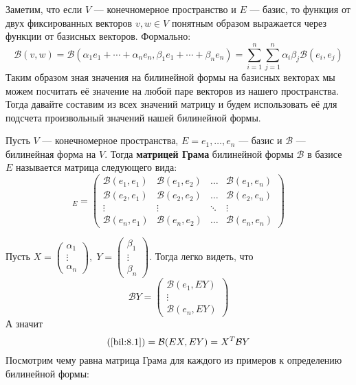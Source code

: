 \documentclass[../main.tex]{subfiles}
\begin{document}
Заметим, что если $V$ --- конечномерное пространство и $E$ --- базис, то функция от двух фиксированных векторов $v, w \in V$ понятным образом выражается через функции от базисных векторов. Формально:
\begin{equation}
\label{bil:8.1}
\tag{*}
  \mathcal{B}(v, w) =
  \mathcal{B}(\alpha_1 e_1 + \dotsb + \alpha_n e_n, \beta_1 e_1 + \dotsb + \beta_n e_n) =
  \sum\limits_{i = 1}^{n} \sum\limits_{j = 1}^{n} \alpha_i \beta_j \mathcal{B}(e_i, e_j)
\end{equation}
Таким образом зная значения на билинейной формы на базисных векторах мы можем посчитать её значение на любой паре векторов из нашего пространства. Тогда давайте составим из всех значений матрицу и будем использовать её для подсчета произвольный значений нашей билинейной формы.

\begin{definition}
  Пусть $V$ --- конечномерное пространства, $E = {e_1, \dotsc, e_n}$ --- базис и $\mathcal{B}$ --- билинейная форма на $V$. Тогда \textbf{матрицей Грама} билинейной формы $\mathcal{B}$ в базисе $E$ называется матрица следующего вида:
  \begin{equation*}
    [\mathcal{B}]_E =
    \begin{pmatrix}
      \mathcal{B}(e_1, e_1) & \mathcal{B}(e_1, e_2) & \hdots & \mathcal{B}(e_1, e_n) \\
      \mathcal{B}(e_2, e_1) & \mathcal{B}(e_2, e_2) & \hdots & \mathcal{B}(e_2, e_n) \\
      \vdots & \vdots & \ddots & \vdots \\
      \mathcal{B}(e_n, e_1) & \mathcal{B}(e_n, e_2) & \hdots & \mathcal{B}(e_n, e_n)
    \end{pmatrix}
  \end{equation*}
\end{definition}

Пусть $X =
\begin{pmatrix}
  \alpha_1 \\
  \vdots \\
  \alpha_n
\end{pmatrix},\;
Y =
\begin{pmatrix}
  \beta_1 \\
  \vdots \\
  \beta_n
\end{pmatrix}$. Тогда легко видеть, что
\begin{equation*}
  \mathcal{B}Y =
  \begin{pmatrix}
    \mathcal{B}(e_1, EY) \\
    \vdots \\
    \mathcal{B}(e_n, EY)
  \end{pmatrix}
\end{equation*}
А значит
\begin{equation*}
  \text{(\ref{bil:8.1})} = \mathcal{B}(EX, EY) = X^T \mathcal{B} Y
\end{equation*}
Посмотрим чему равна матрица Грама для каждого из примеров к определению билинейной формы:
\end{document}
